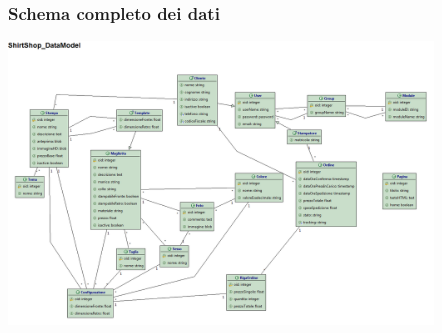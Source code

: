 \documentclass[10pt]{beamer}
\begin{document}
\begin{frame}
	\frametitle{Schema completo dei dati}
	\begin{center}
		\includegraphics[height=7.5cm]{Immagine/SchemaCompletoDati.png}
	\end{center}
\end{frame}
\end{document}
